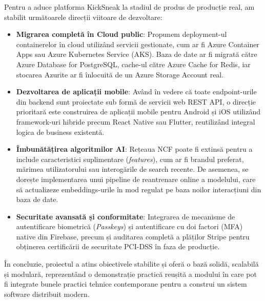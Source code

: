 Pentru a aduce platforma KickSneak la stadiul de produs de producție real, am stabilit următoarele direcții viitoare de dezvoltare:
\begin{itemize}
    \item \textbf{Migrarea completă în Cloud public}: Propunem deployment-ul containerelor în cloud utilizând servicii gestionate, cum ar fi Azure Container Apps sau Azure Kubernetes Service (AKS). Baza de date ar fi migrată către Azure Database for PostgreSQL, cache-ul către Azure Cache for Redis, iar stocarea Azurite ar fi înlocuită de un Azure Storage Account real.
    \item \textbf{Dezvoltarea de aplicații mobile}: Având în vedere că toate endpoint-urile din backend sunt proiectate sub formă de servicii web REST API, o direcție prioritară este construirea de aplicații mobile pentru Android și iOS utilizând framework-uri hibride precum React Native sau Flutter, reutilizând integral logica de business existentă.
    \item \textbf{Îmbunătățirea algoritmilor AI}: Rețeaua NCF poate fi extinsă pentru a include caracteristici suplimentare (\textit{features}), cum ar fi brandul preferat, mărimea utilizatorului sau interogările de search recente. De asemenea, se dorește implementarea unui pipeline de reantrenare online a modelului, care să actualizeze embeddings-urile în mod regulat pe baza noilor interacțiuni din baza de date.
    \item \textbf{Securitate avansată și conformitate}: Integrarea de mecanisme de autentificare biometrică (\textit{Passkeys}) și autentificare cu doi factori (MFA) native din Firebase, precum și auditarea completă a plăților Stripe pentru obținerea certificării de securitate PCI-DSS în faza de producție.
\end{itemize}
 
În concluzie, proiectul a atins obiectivele stabilite și oferă o bază solidă, scalabilă și modulară, reprezentând o demonstrație practică reușită a modului în care pot fi integrate bunele practici tehnice contemporane pentru a construi un sistem software distribuit modern.
